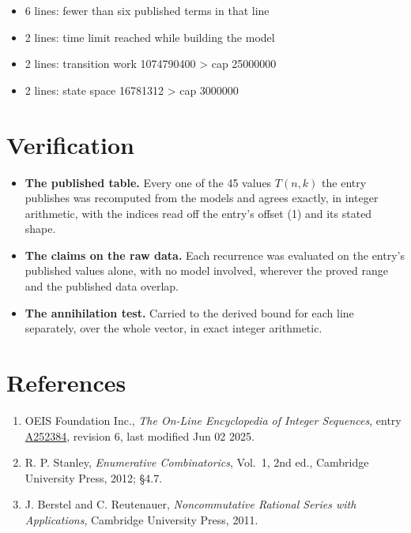 \documentclass[11pt]{article}
\theoremstyle{definition}
\begin{document}
\begin{itemize}

\item 6 lines: fewer than six published terms in that line

\item 2 lines: time limit reached while building the model

\item 2 lines: transition work 1074790400 > cap 25000000

\item 2 lines: state space 16781312 > cap 3000000

\end{itemize}

\section{Verification}

\begin{itemize}

\item {\bfseries The published table.} Every one of the 45 values $T(n,k)$ the entry publishes was recomputed from the models and agrees exactly, in integer arithmetic, with the indices read off the entry's offset (1) and its stated shape.

\item {\bfseries The claims on the raw data.} Each recurrence was evaluated on the entry's published values alone, with no model involved, wherever the proved range and the published data overlap.

\item {\bfseries The annihilation test.} Carried to the derived bound for each line separately, over the whole vector, in exact integer arithmetic.

\end{itemize}

\section{References}

\begin{enumerate}

\item OEIS Foundation Inc., \emph{The On-Line Encyclopedia of Integer Sequences}, entry \href{https://oeis.org/A252384}{A252384}, revision 6, last modified Jun 02 2025.

\item R. P. Stanley, \emph{Enumerative Combinatorics}, Vol.~1, 2nd ed., Cambridge University Press, 2012; \S4.7.

\item J. Berstel and C. Reutenauer, \emph{Noncommutative Rational Series with Applications}, Cambridge University Press, 2011.

\end{enumerate}
\end{document}
